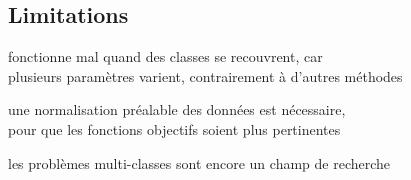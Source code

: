 \subsection{Limitations}


\begin{itmz}

\item{fonctionne mal quand des classes se recouvrent, car\\
plusieurs paramètres varient, contrairement à d’autres méthodes}

\end{itmz}\begin{itmz}

\item{une normalisation préalable des données est nécessaire,\\
pour que les fonctions objectifs soient plus pertinentes}

\end{itmz}\begin{itmz}

\item{les problèmes multi-classes sont encore un champ de recherche}

\end{itmz}


\pagebreak

